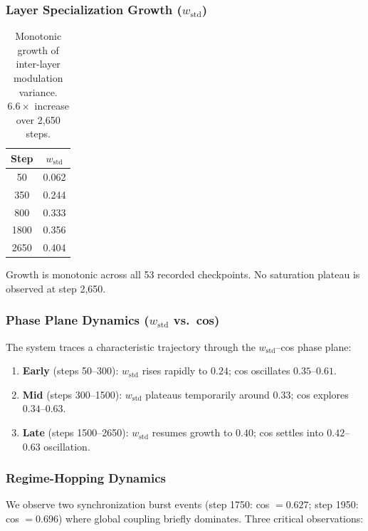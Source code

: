 \documentclass[11pt,a4paper]{article}
\begin{document}
\subsubsection*{Layer Specialization Growth ($w_{\mathrm{std}}$)}

\begin{table}[h]
\centering
\begin{tabular}{cc}
\toprule
\textbf{Step} & $w_{\mathrm{std}}$ \\
\midrule
   50 & 0.062 \\
  350 & 0.244 \\
  800 & 0.333 \\
 1800 & 0.356 \\
 2650 & 0.404 \\
\bottomrule
\end{tabular}
\caption{Monotonic growth of inter-layer modulation variance. $6.6\times$ increase
over 2,650 steps.}
\end{table}

Growth is monotonic across all 53 recorded checkpoints. No saturation plateau is
observed at step 2,650.

\subsubsection*{Phase Plane Dynamics ($w_{\mathrm{std}}$ vs.\ cos)}

The system traces a characteristic trajectory through the
$w_{\mathrm{std}}$--cos phase plane:

\begin{enumerate}
  \item \textbf{Early} (steps 50--300): $w_{\mathrm{std}}$ rises rapidly to $0.24$;
    cos oscillates $0.35$--$0.61$.
  \item \textbf{Mid} (steps 300--1500): $w_{\mathrm{std}}$ plateaus temporarily
    around $0.33$; cos explores $0.34$--$0.63$.
  \item \textbf{Late} (steps 1500--2650): $w_{\mathrm{std}}$ resumes growth to
    $0.40$; cos settles into $0.42$--$0.63$ oscillation.
\end{enumerate}

\subsubsection*{Regime-Hopping Dynamics}

We observe two synchronization burst events (step 1750: cos $= 0.627$; step 1950:
cos $= 0.696$) where global coupling briefly dominates. Three critical observations:
\end{document}
